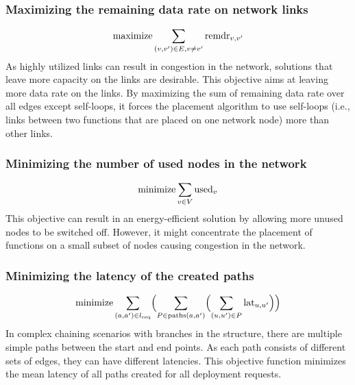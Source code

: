 \documentclass[10pt,a4paper,conference]{IEEEtran}
\begin{document}
\subsubsection{Maximizing the remaining data rate on network links}
\vspace{-1mm}
{\footnotesize
\begin{equation}
 \text{maximize} \sum_{(v,v') {\in} E, v {\neq} v'} \text{remdr}_{v,v'}
\vspace{-1mm}
\end{equation}}As highly utilized links can result in congestion in the network, solutions that
leave more capacity on the links are desirable. This objective
aims at leaving more data rate on the links. By maximizing the sum of remaining
data rate over all edges except self-loops, it forces the placement 
algorithm to use self-loops (i.e., links between two functions that
are placed on one network node) more than other links.
 
\subsubsection{Minimizing the number of used nodes in the network}
\vspace{-1mm}
{\footnotesize
\begin{equation}
 \text{minimize} \sum_{v {\in} V } \text{used}_{v}
 \vspace{-1mm}
\end{equation}
}This objective can result in an energy-efficient solution by allowing more unused 
nodes to be switched off. However, it might concentrate the placement
of functions on a small subset of nodes causing congestion in the network.

\subsubsection{Minimizing the latency of the created paths}
\vspace{-1mm}
{\footnotesize
\begin{equation}
 \text{minimize} \sum_{(a,a') {\in}  l_\text{req}} \Bigl( \sum_{P {\in} \text{paths}(a,a')} \Bigl( \sum_{(u,u') {\in} P} \text{lat}_{u,u'} \Bigr) \Bigr) 
 \vspace{-1mm}
\end{equation}
}In complex chaining scenarios with branches in the structure, there are multiple simple
paths between the start and end points. As each path consists of different sets of
edges, they can have different latencies. This objective function minimizes the
mean latency of all paths created for all deployment requests.
\end{document}
